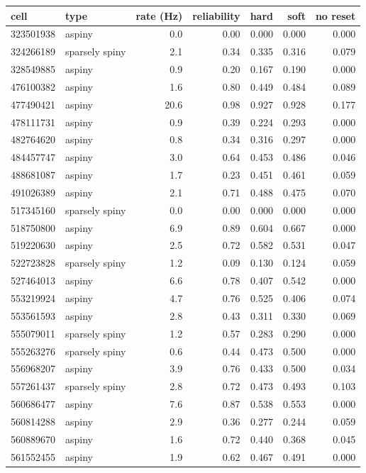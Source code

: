 \begin{tabular}{llrrrrr}
\toprule
cell & type & rate (Hz) & reliability & hard & soft & no reset\\
\midrule
323501938 & aspiny & 0.0 & 0.00 & 0.000 & 0.000 & 0.000\\
324266189 & sparsely spiny & 2.1 & 0.34 & 0.335 & 0.316 & 0.079\\
328549885 & aspiny & 0.9 & 0.20 & 0.167 & 0.190 & 0.000\\
476100382 & aspiny & 1.6 & 0.80 & 0.449 & 0.484 & 0.089\\
477490421 & aspiny & 20.6 & 0.98 & 0.927 & 0.928 & 0.177\\
478111731 & aspiny & 0.9 & 0.39 & 0.224 & 0.293 & 0.000\\
482764620 & aspiny & 0.8 & 0.34 & 0.316 & 0.297 & 0.000\\
484457747 & aspiny & 3.0 & 0.64 & 0.453 & 0.486 & 0.046\\
488681087 & aspiny & 1.7 & 0.23 & 0.451 & 0.461 & 0.059\\
491026389 & aspiny & 2.1 & 0.71 & 0.488 & 0.475 & 0.070\\
517345160 & sparsely spiny & 0.0 & 0.00 & 0.000 & 0.000 & 0.000\\
518750800 & aspiny & 6.9 & 0.89 & 0.604 & 0.667 & 0.000\\
519220630 & aspiny & 2.5 & 0.72 & 0.582 & 0.531 & 0.047\\
522723828 & sparsely spiny & 1.2 & 0.09 & 0.130 & 0.124 & 0.059\\
527464013 & aspiny & 6.6 & 0.78 & 0.407 & 0.542 & 0.000\\
553219924 & aspiny & 4.7 & 0.76 & 0.525 & 0.406 & 0.074\\
553561593 & aspiny & 2.8 & 0.43 & 0.311 & 0.330 & 0.069\\
555079011 & sparsely spiny & 1.2 & 0.57 & 0.283 & 0.290 & 0.000\\
555263276 & sparsely spiny & 0.6 & 0.44 & 0.473 & 0.500 & 0.000\\
556968207 & aspiny & 3.9 & 0.76 & 0.433 & 0.500 & 0.034\\
557261437 & sparsely spiny & 2.8 & 0.72 & 0.473 & 0.493 & 0.103\\
560686477 & aspiny & 7.6 & 0.87 & 0.538 & 0.553 & 0.000\\
560814288 & aspiny & 2.9 & 0.36 & 0.277 & 0.244 & 0.059\\
560889670 & aspiny & 1.6 & 0.72 & 0.440 & 0.368 & 0.045\\
561552455 & aspiny & 1.9 & 0.62 & 0.467 & 0.491 & 0.000\\

\end{tabular}
